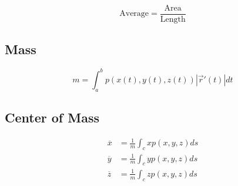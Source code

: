     \begin{equation}
      \text{Average} = \frac{\text{Area}}{\text{Length}}
    \end{equation}

  \subsection{Mass}

    \begin{equation}
      m = \int_{a}^{b} p
      \left(
        x\left( t \right),
        y\left( t \right),
        z\left( t \right)
      \right) \left| \vec{r}'(t) \right| dt
    \end{equation}

  \subsection{Center of Mass}

    \begin{align}
      \overline{x} &= \frac{1}{m} \int_{c} x p\left( x, y, z \right) ds \\
      \overline{y} &= \frac{1}{m} \int_{c} y p\left( x, y, z \right) ds \\
      \overline{z} &= \frac{1}{m} \int_{c} z p\left( x, y, z \right) ds
    \end{align}